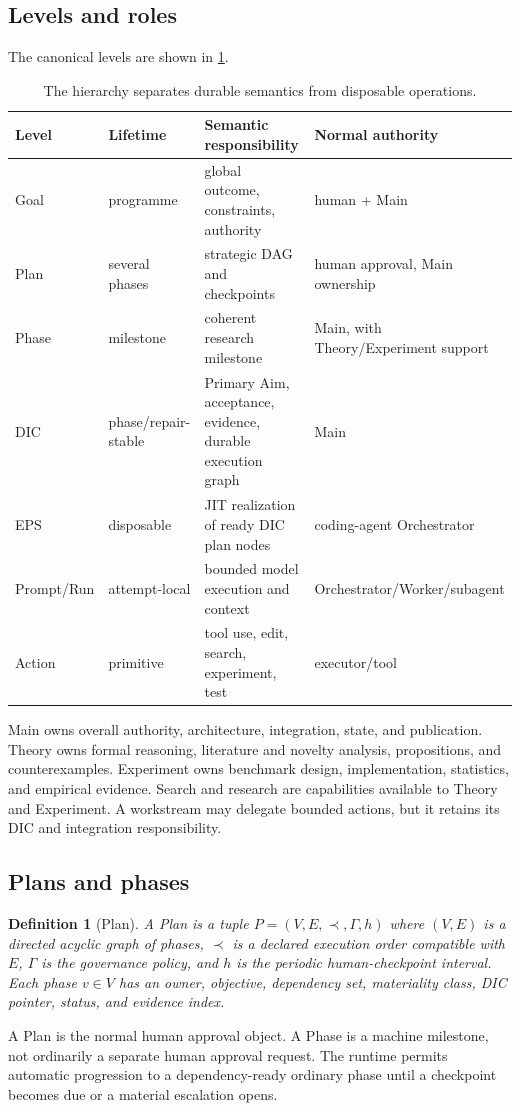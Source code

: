 \documentclass[11pt]{article}
\newtheorem{definition}{Definition}[section]
\begin{document}
\subsection{Levels and roles}
The canonical levels are shown in \cref{tab:levels}.
\begin{table}[ht]
\centering
\small
\begin{tabularx}{\textwidth}{@{}l l X X@{}}
\toprule
Level & Lifetime & Semantic responsibility & Normal authority\\
\midrule
Goal & programme & global outcome, constraints, authority & human + Main\\
Plan & several phases & strategic DAG and checkpoints & human approval, Main ownership\\
Phase & milestone & coherent research milestone & Main, with Theory/Experiment support\\
DIC & phase/repair-stable & Primary Aim, acceptance, evidence, durable execution graph & Main\\
EPS & disposable & JIT realization of ready DIC plan nodes & coding-agent Orchestrator\\
Prompt/Run & attempt-local & bounded model execution and context & Orchestrator/Worker/subagent\\
Action & primitive & tool use, edit, search, experiment, test & executor/tool\\
\bottomrule
\end{tabularx}
\caption{The hierarchy separates durable semantics from disposable operations.}
\label{tab:levels}
\end{table}

Main owns overall authority, architecture, integration, state, and publication. Theory owns formal reasoning, literature and novelty analysis, propositions, and counterexamples. Experiment owns benchmark design, implementation, statistics, and empirical evidence. Search and research are capabilities available to Theory and Experiment. A workstream may delegate bounded actions, but it retains its DIC and integration responsibility.

\subsection{Plans and phases}
\begin{definition}[Plan]
A Plan is a tuple $P=(V,E,\prec,\Gamma,h)$ where $(V,E)$ is a directed acyclic graph of phases, $\prec$ is a declared execution order compatible with $E$, $\Gamma$ is the governance policy, and $h$ is the periodic human-checkpoint interval. Each phase $v\in V$ has an owner, objective, dependency set, materiality class, DIC pointer, status, and evidence index.
\end{definition}
A Plan is the normal human approval object. A Phase is a machine milestone, not ordinarily a separate human approval request. The runtime permits automatic progression to a dependency-ready ordinary phase until a checkpoint becomes due or a material escalation opens.
\end{document}
